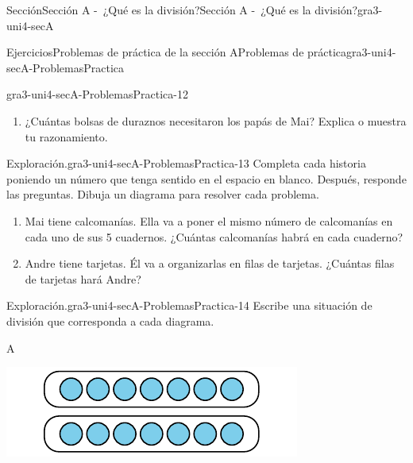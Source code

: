 \documentclass[twoside,10pt,]{article}
\begin{document}
\begin{sectionptx}{Sección}{Sección A -~¿Qué es la división?}{}{Sección A -~¿Qué es la división?}{}{}{gra3-uni4-secA}
\begin{exercises-subsection}{Ejercicios}{Problemas de práctica de la sección A}{}{Problemas de práctica}{}{}{gra3-uni4-secA-ProblemasPractica}
\begin{divisionexercise}{10}{}{}{gra3-uni4-secA-ProblemasPractica-12}
\begin{enumerate}[label={(\alph*)}]
\item{}¿Cuántas bolsas de duraznos necesitaron los papás de Mai? Explica o muestra tu razonamiento.%
\end{enumerate}
%
\end{divisionexercise}%
\begin{divisionexercise}{11}{Exploración.}{}{gra3-uni4-secA-ProblemasPractica-13}%
Completa cada historia poniendo un número que tenga sentido en el espacio en blanco. Después, responde las preguntas. Dibuja un diagrama para resolver cada problema.%
\par
%
\begin{enumerate}[label={(\alph*)}]
\item{}Mai tiene \textunderscore{}\textunderscore{}\textunderscore{}\textunderscore{}\textunderscore{}\textunderscore{}\textunderscore{}\textunderscore{}\textunderscore{}\textunderscore{} calcomanías. Ella va a poner el mismo número de calcomanías en cada uno de sus 5 cuadernos. ¿Cuántas calcomanías habrá en cada cuaderno?%
\item{}Andre tiene \textunderscore{}\textunderscore{}\textunderscore{}\textunderscore{}\textunderscore{}\textunderscore{}\textunderscore{}\textunderscore{}\textunderscore{}\textunderscore{} tarjetas. Él va a organizarlas en filas de \textunderscore{}\textunderscore{}\textunderscore{}\textunderscore{}\textunderscore{}\textunderscore{}\textunderscore{}\textunderscore{}\textunderscore{}\textunderscore{} tarjetas. ¿Cuántas filas de tarjetas hará Andre?%
\end{enumerate}
%
\end{divisionexercise}%
\begin{divisionexercise}{12}{Exploración.}{}{gra3-uni4-secA-ProblemasPractica-14}%
Escribe una situación de división que corresponda a cada diagrama.%
\begin{sidebyside}{3}{0}{0}{0.02}%
\begin{sbspanel}{0.32}%
A%
\par
\includegraphics[width=\linewidth]{external/svg-source/tikz-file-151674.pdf}
\end{sbspanel}%

\end{sidebyside}
\end{divisionexercise}
\end{exercises-subsection}
\end{sectionptx}
\end{document}
